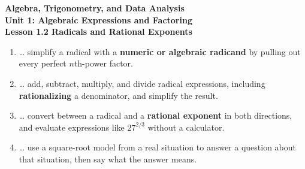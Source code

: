 \documentclass[10pt]{article}
\begin{document}
\vspace{-0.8in}

\begin{center}
  {\color{white}\textbf{\LARGE Algebra, Trigonometry, and Data Analysis}}\\[4pt]
  {\color{mistmid}\large\textbf{Unit 1: Algebraic Expressions and Factoring}}\\[6pt]
  {\color{white}\textbf{\large Lesson 1.2 \quad Radicals and Rational Exponents}}
\end{center}

\vspace{0.22in}
\namedateperiod
\vspace{0.18in}

\begin{learningtargetbox}
\small
\begin{enumerate}[leftmargin=1.5em, itemsep=5pt]
  \item \ldots{} simplify a radical with a \textbf{numeric or algebraic radicand} by pulling out
        every perfect $n$th-power factor.
  \item \ldots{} add, subtract, multiply, and divide radical expressions, including
        \textbf{rationalizing} a denominator, and simplify the result.
  \item \ldots{} convert between a radical and a \textbf{rational exponent} in both directions,
        and evaluate expressions like $27^{2/3}$ without a calculator.
  \item \ldots{} use a square-root model from a real situation to answer a question about that
        situation, then say what the answer means.
\end{enumerate}
\end{learningtargetbox}

\vspace{0.14in}
\end{document}
